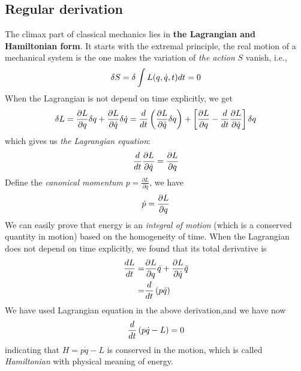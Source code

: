\documentclass[letterpaper,10pt,english]{sphinxmanual}
\begin{document}
\subsection{Regular derivation}
\label{CM/Lagrangian:id2}\label{CM/Lagrangian:regular-derivation}
The climax part of classical mechanics lies in \textbf{the Lagrangian and Hamiltonian form}. It starts with the extremal principle, the real motion of a mechanical system is the one makes the variation of \emph{the action} \(S\) vanish, i.e.,
\begin{gather}
\begin{split}\delta S=\delta \int L(q,\dot{q},t) dt=0\end{split}\notag
\end{gather}
When the Lagrangian is not depend on time explicitly, we get
\begin{gather}
\begin{split}\delta L=\frac{\partial L}{\partial q}\delta q+\frac{\partial L}{\partial \dot{q}}\delta \dot{q}=\frac{d}{dt}\left(\frac{\partial L}{\partial \dot{q}}\delta {q}\right)+\left[\frac{\partial L}{\partial q}-\frac{d}{dt}\frac{\partial L}{\partial \dot{q}}\right]\delta q\end{split}\notag
\end{gather}
which gives us \emph{the Lagrangian equation}:
\begin{gather}
\begin{split}\frac{d}{dt}\frac{\partial L}{\partial \dot{q}}=\frac{\partial L}{\partial q}\end{split}\notag
\end{gather}
Define the \emph{canonical momentum} \(p=\frac{\partial L}{\partial \dot{q}}\), we have
\begin{gather}
\begin{split}\dot{p}=\frac{\partial L}{\partial q}\end{split}\notag
\end{gather}
We can easily prove that energy is an \emph{integral of motion} (which is a conserved quantity in motion) based on the homogeneity of time. When the Lagrangian does not depend on time explicitly, we found that its total derivative is
\begin{gather}
\begin{split}\frac{dL}{dt}=&\frac{\partial L}{\partial q}\dot{q}+\frac{\partial L}{\partial \dot{q}} \ddot{q}\\
=&\frac{d}{dt}\left(p\dot{q}\right)\end{split}\notag
\end{gather}
We have used Lagrangian equation in the above derivation,and we have now
\begin{gather}
\begin{split}\frac{d}{dt}\left(p\dot{q}-L\right)=0\end{split}\notag
\end{gather}
indicating that \(H=p\dot{q}-L\) is conserved in the motion, which is called \emph{Hamiltonian} with physical meaning of energy.
\end{document}
